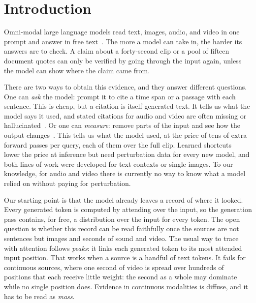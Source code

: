 \section{Introduction}
\label{sec:intro}

Omni-modal large language models read text, images, audio, and video in one prompt and answer in free text~\cite{gpt6astra2026, gemini38flash2026, Xu2025Qwen3OmniTR, cui2026minicpm, xu2025qwen2, ye2026omnivinci}.
The more a model can take in, the harder its answers are to check. A claim about a forty-second clip or a pool of fifteen document quotes can only be verified by going through the input again, unless the model can show where the claim came from.

There are two ways to obtain this evidence, and they answer different questions.
One can \emph{ask} the model: prompt it to cite a time span or a passage with each sentence. This is cheap, but a citation is itself generated text. It tells us what the model says it used, and stated citations for audio and video are often missing or hallucinated~\cite{wan2026murgat}.
Or one can \emph{measure}: remove parts of the input and see how the output changes~\cite{cohen-wang2024contextcite}. This tells us what the model used, at the price of tens of extra forward passes per query, each of them over the full clip.
Learned shortcuts~\cite{cohenwang2025at2, kang2026vstream} lower the price at inference but need perturbation data for every new model, and both lines of work were developed for text contexts or single images.
To our knowledge, for audio and video there is currently no way to know what a model relied on without paying for perturbation.

Our starting point is that the model already leaves a record of where it looked.
Every generated token is computed by attending over the input, so the generation pass contains, for free, a distribution over the input for every token.
The open question is whether this record can be read faithfully once the sources are not sentences but images and seconds of sound and video.
The usual way to trace with attention follows \emph{peaks}: it links each generated token to its most attended input position.
That works when a source is a handful of text tokens. It fails for continuous sources, where one second of video is spread over hundreds of positions that each receive little weight: the second as a whole may dominate while no single position does.
Evidence in continuous modalities is diffuse, and it has to be read as \emph{mass}.

